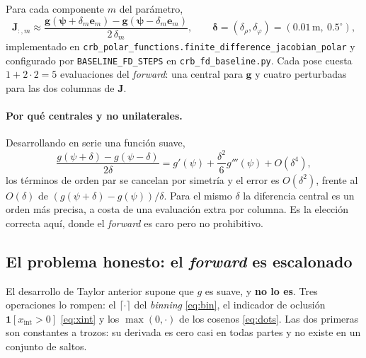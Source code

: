 \documentclass[11pt,a4paper]{article}
\newcommand{\vect}[1]{\boldsymbol{#1}}
\newcommand{\matr}[1]{\mathbf{#1}}
\newcommand{\code}[1]{\texttt{#1}}
\theoremstyle{definition}
\theoremstyle{plain}
\begin{document}
Para cada componente $m$ del parámetro,
%
\begin{equation}
\label{eq:fd}
\matr J_{:,m} \approx
\frac{\vect g(\vect\psi+\delta_m\vect e_m)-\vect g(\vect\psi-\delta_m\vect e_m)}
     {2\,\delta_m},
\qquad
\vect\delta = (\delta_\rho,\delta_\varphi) = (0.01\,\text{m},\ 0.5^\circ),
\end{equation}
%
implementado en \code{crb\_polar\_functions.finite\_difference\_jacobian\_polar}
y configurado por \code{BASELINE\_FD\_STEPS} en \code{crb\_fd\_baseline.py}.
Cada pose cuesta $1+2\cdot2=5$ evaluaciones del \emph{forward}: una central para
$\vect g$ y cuatro perturbadas para las dos columnas de $\matr J$.

\paragraph{Por qué centrales y no unilaterales.}
Desarrollando en serie una función suave,
%
\[
\frac{g(\psi+\delta)-g(\psi-\delta)}{2\delta}
= g'(\psi) + \frac{\delta^2}{6}g'''(\psi) + O(\delta^4),
\]
%
los términos de orden par se cancelan por simetría y el error es
$O(\delta^2)$, frente al $O(\delta)$ de $(g(\psi+\delta)-g(\psi))/\delta$. Para
el mismo $\delta$ la diferencia central es un orden más precisa, a costa de una
evaluación extra por columna. Es la elección correcta aquí, donde el
\emph{forward} es caro pero no prohibitivo.

\subsection{El problema honesto: el \emph{forward} es escalonado}

El desarrollo de Taylor anterior supone que $g$ es suave, y \textbf{no lo es}.
Tres operaciones lo rompen: el $\lceil\cdot\rceil$ del \emph{binning}
\eqref{eq:bin}, el indicador de oclusión $\mathbf 1[x_{\text{int}}>0]$
\eqref{eq:xint} y los $\max(0,\cdot)$ de los cosenos \eqref{eq:dots}. Las dos
primeras son constantes a trozos: su derivada es cero casi en todas partes y no
existe en un conjunto de saltos.
\end{document}
